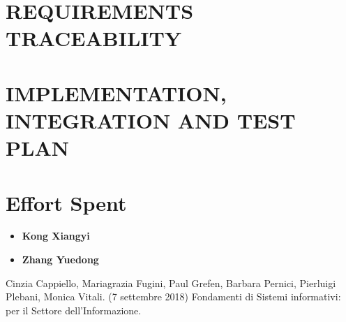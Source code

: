 \documentclass[a4paper,12pt]{report}
\begin{document}
\chapter{REQUIREMENTS TRACEABILITY}
\chapter{IMPLEMENTATION, INTEGRATION AND TEST PLAN}


\chapter{Effort Spent}

\begin{itemize}
	\item \textbf{Kong Xiangyi}
	\begin{center}
	\end{center}
	
	
	\item \textbf{Zhang Yuedong}
	\begin{center}
	\end{center}
\end{itemize}




\begin{thebibliography}{9}
	
Cinzia Cappiello, Mariagrazia Fugini, Paul Grefen, Barbara Pernici, Pierluigi Plebani, Monica Vitali. (7 settembre 2018)  Fondamenti di Sistemi informativi: per il Settore dell’Informazione. 



\end{thebibliography}
\end{document}
